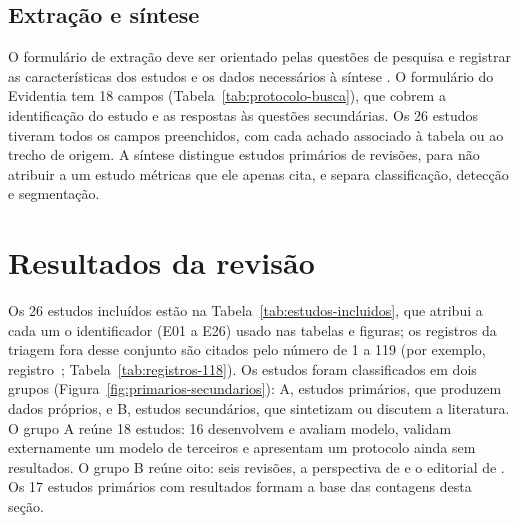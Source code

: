 \subsection{Extração e síntese}
\label{subsec:extracao}

O formulário de extração deve ser orientado pelas questões de pesquisa e
registrar as características dos estudos e os dados necessários à síntese
\cite{wohlin2024}. O formulário do Evidentia tem 18 campos
(Tabela~\ref{tab:protocolo-busca}), que cobrem a identificação do estudo
e as respostas às questões secundárias. Os 26 estudos tiveram todos os campos preenchidos,
com cada achado associado à tabela ou ao trecho de origem. A síntese
distingue estudos primários de revisões, para não atribuir a um estudo
métricas que ele apenas cita, e separa classificação, detecção e
segmentação.

\section{Resultados da revisão}
\label{sec:resultados-revisao}

Os 26 estudos incluídos estão na Tabela~\ref{tab:estudos-incluidos}, que
atribui a cada um o identificador (E01 a E26) usado nas tabelas e figuras; os registros da triagem fora desse conjunto são
citados pelo número de 1 a 119 (por exemplo, registro~;
Tabela~\ref{tab:registros-118}). Os estudos foram classificados em dois
grupos (Figura~\ref{fig:primarios-secundarios}): A, estudos primários, que
produzem dados próprios, e B, estudos secundários, que sintetizam ou
discutem a literatura. O grupo A reúne 18 estudos: 16 desenvolvem e
avaliam modelo,  validam externamente um modelo de
terceiros e  apresentam um protocolo ainda sem
resultados. O grupo B reúne oito: seis revisões, a perspectiva de
 e o editorial de . Os 17
estudos primários com resultados formam a base das contagens desta seção.

